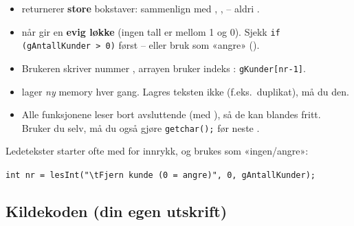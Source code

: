 \begin{felle}
\begin{itemize}
  \item {} returnerer \textbf{store} bokstaver: sammenlign med , ,  -- aldri .
  \item {} når  gir en \textbf{evig løkke} (ingen tall er mellom 1 og 0).
        Sjekk \lstinline|if (gAntallKunder > 0)| først -- eller bruk  som «angre» ().
  \item Brukeren skriver nummer , arrayen bruker indeks : \lstinline|gKunder[nr-1]|.
  \item {} lager \emph{ny} memory hver gang. Lagres teksten ikke (f.eks.\ duplikat), må du  den.
  \item Alle funksjonene leser bort avsluttende  (med ), så de kan blandes fritt.
        Bruker du  selv, må du også gjøre \lstinline|getchar();| før neste .
\end{itemize}
\end{felle}

\begin{tips}
Ledetekster starter ofte med  for innrykk, og  brukes som «ingen/angre»:\par
\lstinline|int nr = lesInt("\tFjern kunde (0 = angre)", 0, gAntallKunder);|
\end{tips}

\subsection{Kildekoden (din egen utskrift)}

